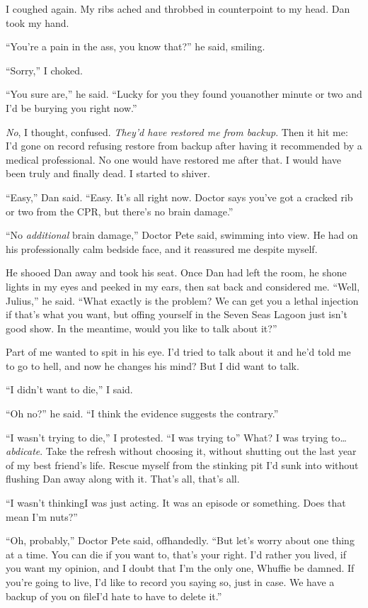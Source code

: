I coughed again. My ribs ached and throbbed in counterpoint to my
head. Dan took my hand.

“You're a pain in the ass, you know that?” he said, smiling.

“Sorry,” I choked.

“You sure are,” he said. “Lucky for you they found you{\dash}another
minute or two and I'd be burying you right now.”

\emph{No}, I thought, confused.
\emph{They'd have restored me from backup}. Then it hit me: I'd
gone on record refusing restore from backup after having it
recommended by a medical professional. No one would have restored
me after that. I would have been truly and finally dead. I started
to shiver.

“Easy,” Dan said. “Easy. It's all right now. Doctor says you've got
a cracked rib or two from the CPR, but there's no brain damage.”

“No \emph{additional} brain damage,” Doctor Pete said, swimming
into view. He had on his professionally calm bedside face, and it
reassured me despite myself.

He shooed Dan away and took his seat. Once Dan had left the room,
he shone lights in my eyes and peeked in my ears, then sat back and
considered me. “Well, Julius,” he said. “What exactly is the
problem? We can get you a lethal injection if that's what you want,
but offing yourself in the Seven Seas Lagoon just isn't good show.
In the meantime, would you like to talk about it?”

Part of me wanted to spit in his eye. I'd tried to talk about it
and he'd told me to go to hell, and now he changes his mind? But I
did want to talk.

“I didn't want to die,” I said.

“Oh no?” he said. “I think the evidence suggests the contrary.”

“I wasn't trying to die,” I protested. “I was trying to{\dash}” What? I
was trying to… \emph{abdicate}. Take the refresh without choosing
it, without shutting out the last year of my best friend's life.
Rescue myself from the stinking pit I'd sunk into without flushing
Dan away along with it. That's all, that's all.

“I wasn't thinking{\dash}I was just acting. It was an episode or
something. Does that mean I'm nuts?”

“Oh, probably,” Doctor Pete said, offhandedly. “But let's worry
about one thing at a time. You can die if you want to, that's your
right. I'd rather you lived, if you want my opinion, and I doubt
that I'm the only one, Whuffie be damned. If you're going to live,
I'd like to record you saying so, just in case. We have a backup of
you on file{\dash}I'd hate to have to delete it.”

